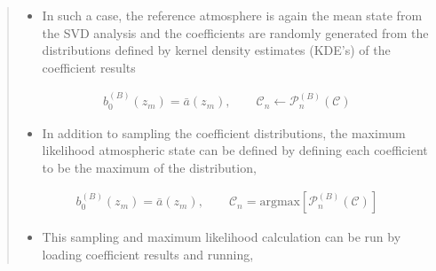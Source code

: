 \documentclass[letterpaper,10pt,english]{sphinxmanual}
\begin{document}
\begin{itemize}
\begin{quote}
\begin{itemize}
\item {} 
\sphinxAtStartPar
In such a case, the reference atmosphere is again the mean state from the SVD analysis and the coefficients are randomly generated from the distributions defined by kernel density estimates (KDE’s) of the coefficient results

\end{itemize}
\begin{equation*}
\begin{split}b_0^{(B)} \left( z_m \right) = \bar{a}  \left( z_m \right) , \quad \quad \mathcal{C}_n \longleftarrow \mathcal{P}_n^{(B)} \left( \mathcal{C} \right)\end{split}
\end{equation*}\begin{itemize}
\item {} 
\sphinxAtStartPar
In addition to sampling the coefficient distributions, the maximum likelihood atmospheric state can be defined by defining each coefficient to be the maximum of the distribution,

\end{itemize}
\begin{equation*}
\begin{split}b_0^{(B)} \left( z_m \right) = \bar{a}  \left( z_m \right) , \quad \quad \mathcal{C}_n = \text{argmax} \left[ \mathcal{P}_n^{(B)} \left( \mathcal{C} \right) \right]\end{split}
\end{equation*}\begin{itemize}
\item {} 
\sphinxAtStartPar
This sampling and maximum likelihood calculation can be run by loading coefficient results and running,

\end{itemize}

\begin{sphinxVerbatim}[commandchars=\\\{\}]
  
   
   
   


\end{sphinxVerbatim}
\end{quote}
\end{itemize}
\end{document}
